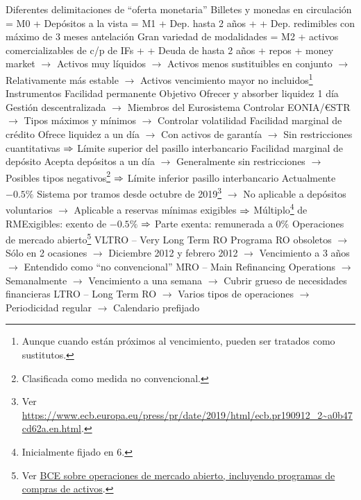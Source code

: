 \documentclass{nuevotema}
\begin{document}
\begin{esquemal}
				\4[] Diferentes delimitaciones de ``oferta monetaria''
				\4[M0] Billetes y monedas en circulación
				\4[M1] = M0 + Depósitos a la vista
				\4[M2] = M1 + Dep. hasta 2 años +
				\4[] + Dep. redimibles con máximo de 3 meses antelación
				\4[$\to$] Gran variedad de modalidades
				\4[M3] = M2 + activos comercializables de c/p de IFs +
				\4[] + Deuda de hasta 2 años + repos + money market
				\4[] $\to$ Activos muy líquidos
				\4[] $\to$ Activos menos sustituibles en conjunto
				\4[] $\to$ Relativamente más estable
				\4[] $\to$ Activos vencimiento mayor no incluidos\footnote{Aunque cuando están próximos al vencimiento, pueden ser tratados como sustitutos.}
		\2 Instrumentos
			\3 Facilidad permanente
				\4 Objetivo
				\4[] Ofrecer y absorber liquidez 1 día
				\4[] Gestión descentralizada
				\4[] $\to$ Miembros del Eurosistema
				\4[] Controlar EONIA/€STR
				\4[] $\to$ Tipos máximos y mínimos
				\4[] $\to$ Controlar volatilidad
				\4 Facilidad marginal de crédito
				\4[] Ofrece liquidez a un día
				\4[] $\to$ Con activos de garantía
				\4[] $\to$ Sin restricciones cuantitativas
				\4[] $\Rightarrow$ Límite superior del pasillo interbancario
				\4 Facilidad marginal de depósito
				\4[] Acepta depósitos a un día
				\4[] $\to$ Generalmente sin restricciones
				\4[] $\to$ Posibles tipos negativos\footnote{Clasificada como medida no convencional.}
				\4[] $\Rightarrow$ Límite inferior pasillo interbancario
				\4[] Actualmente $-0.5\%$
				\4[] Sistema por tramos desde octubre de 2019\footnote{Ver \url{https://www.ecb.europa.eu/press/pr/date/2019/html/ecb.pr190912_2~a0b47cd62a.en.html}.}
				\4[] $\to$ No aplicable a depósitos voluntarios
				\4[] $\to$ Aplicable a reservas mínimas exigibles
				\4[] $\Rightarrow$ Múltiplo\footnote{Inicialmente fijado en $6$.} de RMExigibles: exento de $-0.5\%$
				\4[] $\Rightarrow$ Parte exenta: remunerada a $0\%$
			\3 Operaciones de mercado abierto\footnote{Ver \href{https://www.ecb.europa.eu/mopo/implement/omo/html/index.en.html}{BCE sobre operaciones de mercado abierto, incluyendo programas de compras de activos}.}
				\4 VLTRO -- Very Long Term RO
				\4[] Programa RO obsoletos
				\4[] $\to$ Sólo en 2 ocasiones
				\4[] $\to$ Diciembre 2012 y febrero 2012
				\4[] $\to$ Vencimiento a 3 años
				\4[] $\to$ Entendido como ``no convencional''
				\4 MRO -- Main Refinancing Operations
				\4[] $\to$ Semanalmente
				\4[] $\to$ Vencimiento a una semana
				\4[] $\to$ Cubrir grueso de necesidades financieras
				\4 LTRO -- Long Term RO
				\4[] $\to$ Varios tipos de operaciones
				\4[] $\to$ Periodicidad regular
				\4[] $\to$ Calendario prefijado

\end{esquemal}
\end{document}
